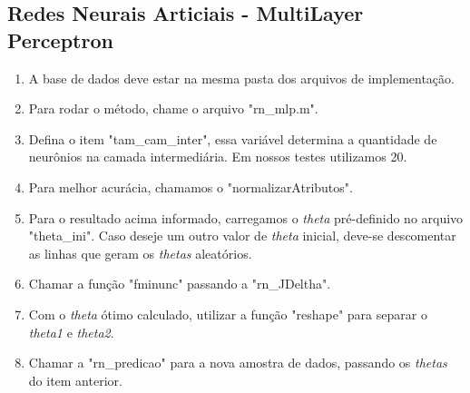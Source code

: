 \documentclass[10pt, conference, compsocconf]{IEEEtran}
\begin{document}
\subsection{Redes Neurais Articiais - MultiLayer Perceptron}
\begin{enumerate}
\item A base de dados deve estar na mesma pasta dos arquivos de implementação.
\item Para rodar o método, chame o arquivo "rn\_mlp.m".
\item Defina o item "tam\_cam\_inter", essa variável determina a quantidade de neurônios na camada intermediária. Em nossos testes utilizamos 20.
\item Para melhor acurácia, chamamos o "normalizarAtributos".
\item Para o resultado acima informado, carregamos o \textit{theta} pré-definido no arquivo "theta\_ini". Caso deseje um outro valor de \textit{theta} inicial, deve-se descomentar as linhas que geram os \textit{thetas} aleatórios.
\item Chamar a função "fminunc" passando a "rn\_JDeltha".
\item Com o \textit{theta} ótimo calculado, utilizar a função "reshape" para separar o \textit{theta1} e \textit{theta2}.
\item Chamar a "rn\_predicao" para a nova amostra de dados, passando os \textit{thetas} do item anterior.
\end{enumerate}
\end{document}
